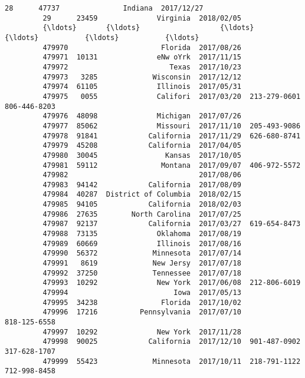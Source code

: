 \documentclass[11pt]{article}
\begin{document}
\begin{Verbatim}[commandchars=\\\{\}]
         28      47737               Indiana  2017/12/27                               
         29      23459              Virginia  2018/02/05                               
         {\ldots}       {\ldots}                   {\ldots}         {\ldots}           {\ldots}           {\ldots}   
         479970                      Florida  2017/08/26                               
         479971  10131              eNw oYrk  2017/11/15                               
         479972                        Texas  2017/10/23                               
         479973   3285             Wisconsin  2017/12/12                               
         479974  61105              Illinois  2017/05/31                               
         479975   0055              Califori  2017/03/20  213-279-0601  806-446-8203   
         479976  48098              Michigan  2017/07/26                               
         479977  85062              Missouri  2017/11/10  205-493-9086                 
         479978  91841            California  2017/11/29  626-680-8741                 
         479979  45208            California  2017/04/05                               
         479980  30045                Kansas  2017/10/05                               
         479981  59112               Montana  2017/09/07  406-972-5572                 
         479982                               2017/08/06                               
         479983  94142            California  2017/08/09                               
         479984  40287  District of Columbia  2018/02/15                               
         479985  94105            California  2018/02/03                               
         479986  27635        North Carolina  2017/07/25                               
         479987  92137            California  2017/03/27  619-654-8473                 
         479988  73135              Oklahoma  2017/08/19                               
         479989  60669              Illinois  2017/08/16                               
         479990  56372             Minnesota  2017/07/14                               
         479991   8619             New Jersy  2017/07/18                               
         479992  37250             Tennessee  2017/07/18                               
         479993  10292              New York  2017/06/08  212-806-6019                 
         479994                         Iowa  2017/05/13                               
         479995  34238               Florida  2017/10/02                               
         479996  17216          Pennsylvania  2017/07/10                818-125-6558   
         479997  10292              New York  2017/11/28                               
         479998  90025            California  2017/12/10  901-487-0902  317-628-1707   
         479999  55423             Minnesota  2017/10/11  218-791-1122  712-998-8458   
         

\end{Verbatim}
\end{document}

